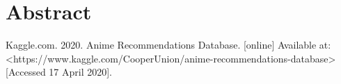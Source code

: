 \documentclass[a4paper, 10pt]{article}
\begin{document}


\section{Abstract}


\begin{thebibliography}{9}
Kaggle.com. 2020. Anime Recommendations Database. [online] Available at: <https://www.kaggle.com/CooperUnion/anime-recommendations-database> [Accessed 17 April 2020].

\end{thebibliography}
\end{document}
